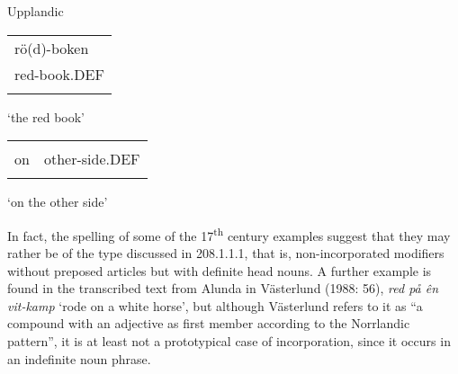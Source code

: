 
\begin{listWWNumileveli}
\item 

\begin{styleExample}
Upplandic

\end{styleExample}

\end{listWWNumileveli}

\begin{listWWNumlxvileveli}
\item 

\end{listWWNumlxvileveli}

\begin{tabular}{l}
\lsptoprule
rö(d)-boken\\
red-book.DEF\\
\lspbottomrule
\end{tabular}

\begin{styleTranslation}
‘the red book’

\end{styleTranslation}

\begin{tabular}{ll}
\lsptoprule
\multicolumn{2}{l}{på

}\\
on & other-side.DEF\\
\lspbottomrule
\end{tabular}

\begin{styleTranslation}
 ‘on the other side’

\end{styleTranslation}

\begin{styleBodyTextFirst}
In fact, the spelling of some of the 17\textsuperscript{th} century examples suggest that they may rather be of the type discussed in 208.1.1.1, that is, non-incorporated modifiers without preposed articles but with definite head nouns. A further example is found in the transcribed text from Alunda in Västerlund (1988: 56), \textit{red på ên vi{\textasciigrave}t-kamp} ‘rode on a white horse’, but although Västerlund refers to it as “a compound with an adjective as first member according to the Norrlandic pattern”, it is at least not a prototypical case of incorporation, since it occurs in an indefinite noun phrase.

\end{styleBodyTextFirst}

